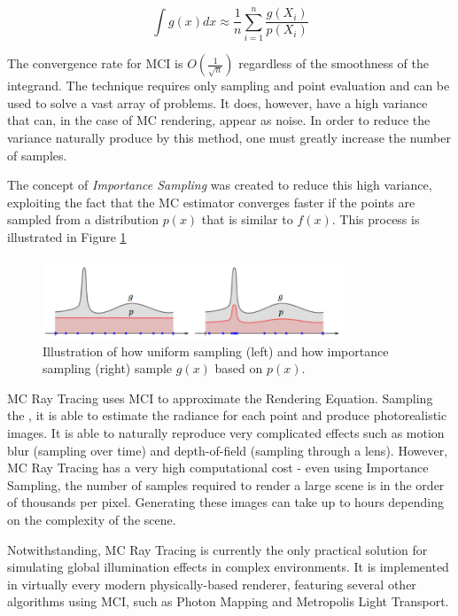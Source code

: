 $$ \int g(x)dx \approx \frac{1}{n} \sum_{i = 1}^{n} \frac{g(X_i)}{p(X_i)}$$

The convergence rate for MCI is $O(\frac{1}{\sqrt{n}})$ regardless of the smoothness of the integrand. The technique requires only sampling and point evaluation and can be used to solve a vast array of problems. It does, however, have a high variance that can, in the case of MC rendering, appear as noise. In order to reduce the variance naturally produce by this method, one must greatly increase the number of samples.

The concept of \textit{Importance Sampling} was created to reduce this high variance, exploiting the fact that the MC estimator converges faster if the points are sampled from a distribution $p(x)$ that is similar to $f(x)$. This process is illustrated in Figure \ref{fig:importance}

\begin{figure}[h]
  \centering
  \includegraphics[width=0.8\textwidth,height=\textheight,keepaspectratio]{images/3_theoretical_foundations/importance.png}
  \caption{Illustration of how uniform sampling (left) and how importance sampling (right) sample $g(x)$ based on $p(x)$. }
  \label{fig:importance}
\end{figure}


MC Ray Tracing uses MCI to approximate the Rendering Equation. Sampling the , it is able to estimate the radiance for each point and produce photorealistic images. It is able to naturally reproduce very complicated effects such as motion blur (sampling over time) and depth-of-field (sampling through a lens). However, MC Ray Tracing has a very high computational cost - even using Importance Sampling, the number of samples required to render a large scene is in the order of thousands per pixel. Generating these images can take up to hours depending on the complexity of the scene. 

Notwithstanding, MC Ray Tracing is currently the only practical solution for simulating global illumination effects in complex environments. It is implemented in virtually every modern physically-based renderer, featuring several other algorithms using MCI, such as Photon Mapping and Metropolis Light Transport.